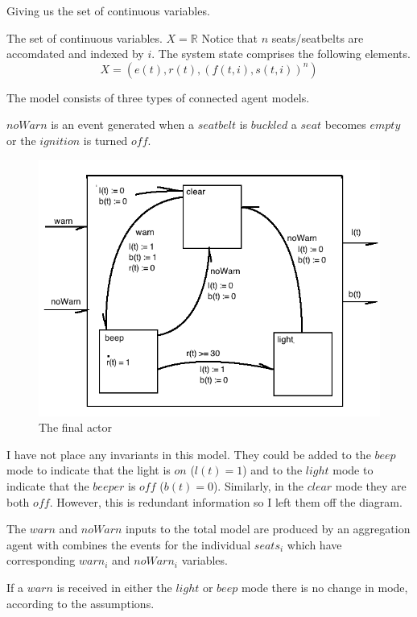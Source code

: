 \documentclass{article}
\begin{document}
Giving us the set of continuous variables.

The set of continuous variables.
$X = \mathbb{R}$
Notice that $n$ seats/seatbelts are accomdated and indexed by $i$.
The system state comprises the following elements.
\begin{equation}
 X = (e(t), r(t), (f(t,i), s(t,i))^n)
\end{equation}


The model consists of three types of connected agent models.

$noWarn$ is an event generated when a $seatbelt$ is $buckled$
a $seat$ becomes $empty$ or the $ignition$ is turned $off$.

\begin{figure}[h!]
\centering
\includegraphics[scale=0.7]{hw7_4b_actor_total.png}
\caption{The final actor}
\label{fig:4b_actor_total}
\end{figure}

I have not place any invariants in this model.
They could be added to the $beep$ mode to indicate
that the light is $on$ ($l(t) = 1$) and to the $light$ mode to
indicate that the $beeper$ is $off$ ($b(t) = 0$).
Similarly, in the $clear$ mode they are both $off$.
However, this is redundant information so I left
them off the diagram.


The $warn$ and $noWarn$ inputs to the total model are
produced by an aggregation agent with combines the
events for the individual $seats_i$ which have corresponding
$warn_i$ and $noWarn_i$ variables.

If a $warn$ is received in either the $light$ or $beep$
mode there is no change in mode, according to
 the assumptions.
\end{document}
